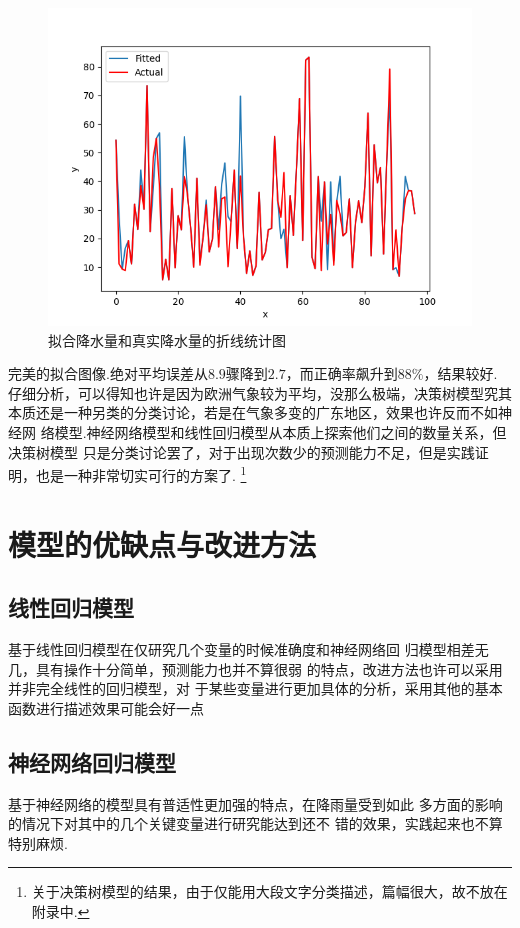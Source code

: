 \documentclass[UTF8, a4paper]{ctexart}
\begin{document}
\begin{figure}[h!]
	\centering
	\includegraphics[scale=0.3]{very_success.png}
	\caption{拟合降水量和真实降水量的折线统计图}
\end{figure}

完美的拟合图像.绝对平均误差从$8.9$骤降到$2.7$，而正确率飙升到$88\%$，结果较好.
仔细分析，可以得知也许是因为欧洲气象较为平均，没那么极端，决策树模型究其
本质还是一种另类的分类讨论，若是在气象多变的广东地区，效果也许反而不如神经网
络模型.神经网络模型和线性回归模型从本质上探索他们之间的数量关系，但决策树模型
只是分类讨论罢了，对于出现次数少的预测能力不足，但是实践证明，也是一种非常切实可行的方案了.
\footnote{关于决策树模型的结果，由于仅能用大段文字分类描述，篇幅很大，故不放在附录中.}



\section{模型的优缺点与改进方法}

\subsection{线性回归模型}
基于线性回归模型在仅研究几个变量的时候准确度和神经网络回
归模型相差无几，具有操作十分简单，预测能力也并不算很弱
的特点，改进方法也许可以采用并非完全线性的回归模型，对
于某些变量进行更加具体的分析，采用其他的基本函数进行描述效果可能会好一点

\subsection{神经网络回归模型}
基于神经网络的模型具有普适性更加强的特点，在降雨量受到如此
多方面的影响的情况下对其中的几个关键变量进行研究能达到还不
错的效果，实践起来也不算特别麻烦.
\end{document}

